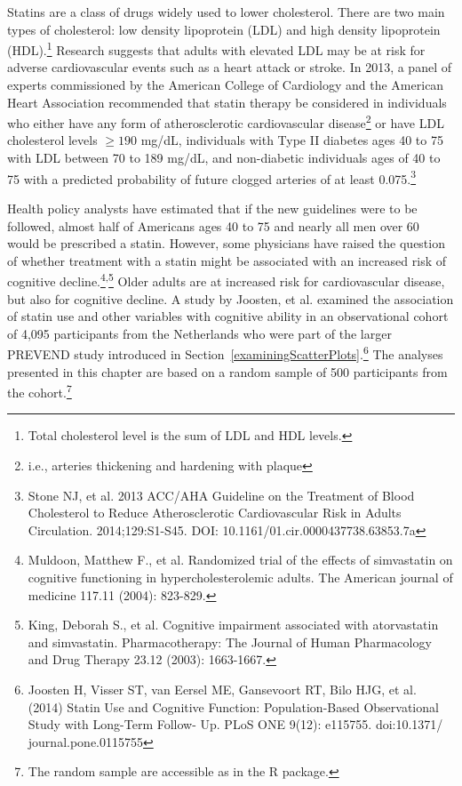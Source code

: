 Statins are a class of drugs widely used to lower cholesterol. There are two main types of cholesterol: low density lipoprotein (LDL) and high density lipoprotein (HDL).\footnote{Total cholesterol level is the sum of LDL and HDL levels.} Research suggests that adults with elevated LDL may be at risk for adverse cardiovascular events such as a heart attack or stroke. In 2013, a panel of experts commissioned by the American College of Cardiology and the American Heart Association recommended that statin therapy be considered in individuals who either have any form of atherosclerotic cardiovascular disease\footnote{i.e., arteries thickening and hardening with plaque} or have LDL cholesterol levels $\geq 190$ mg/dL, individuals with Type II diabetes ages 40 to 75 with LDL between 70 to 189 mg/dL, and non-diabetic individuals ages of 40 to 75 with a predicted probability of future clogged arteries of at least 0.075.\footnote{Stone NJ, et al. 2013 ACC/AHA Guideline on the Treatment of Blood Cholesterol to Reduce Atherosclerotic Cardiovascular Risk in Adults Circulation. 2014;129:S1-S45. DOI: 10.1161/01.cir.0000437738.63853.7a}



Health policy analysts have estimated that if the new guidelines were to be 
followed, almost half of Americans ages 40 to 75 and nearly all men over 60 would be prescribed a statin. However, some physicians have raised the question of whether treatment with a statin might be associated with an increased risk of cognitive decline.\footnote{Muldoon, Matthew F., et al. Randomized trial of the effects of simvastatin on cognitive functioning in hypercholesterolemic adults. The American journal of medicine 117.11 (2004): 823-829.}\textsuperscript{,}\footnote{King, Deborah S., et al. Cognitive impairment associated with atorvastatin and simvastatin. Pharmacotherapy: The Journal of Human Pharmacology and Drug Therapy 23.12 (2003): 1663-1667.} Older adults are at increased risk for cardiovascular disease, but also for cognitive decline. A study by Joosten, et al. examined the association of statin use and other variables with cognitive ability in an observational cohort of 4,095 participants from the Netherlands who were part of the larger PREVEND study introduced in Section~\ref{examiningScatterPlots}.\footnote{Joosten H, Visser ST, van Eersel ME, Gansevoort RT, Bilo HJG, et al. (2014) Statin Use and Cognitive Function: Population-Based Observational Study with Long-Term Follow- Up. PLoS ONE 9(12): e115755. doi:10.1371/ journal.pone.0115755} The analyses presented in this chapter are based on a random sample of 500 participants from the cohort.\footnote{The random sample are accessible as  in the  \textsf{R} package.}

